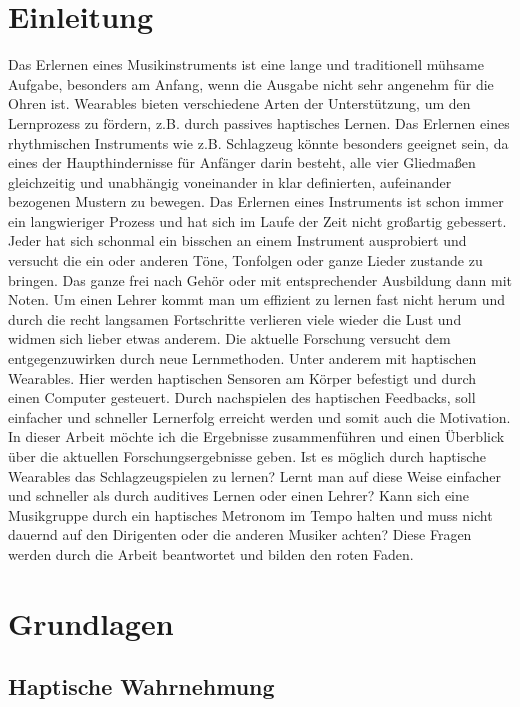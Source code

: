 \documentclass[ngerman,runningheads,a4paper]{llncs}
\begin{document}
\section{Einleitung}
Das Erlernen eines Musikinstruments ist eine lange und traditionell mühsame Aufgabe, besonders am Anfang, wenn die Ausgabe nicht sehr angenehm für die Ohren ist. Wearables bieten verschiedene Arten der Unterstützung, um den Lernprozess zu fördern, z.B. durch passives haptisches Lernen. Das Erlernen eines rhythmischen Instruments wie z.B. Schlagzeug könnte besonders geeignet sein, da eines der Haupthindernisse für Anfänger darin besteht, alle vier Gliedmaßen gleichzeitig und unabhängig voneinander in klar definierten, aufeinander bezogenen Mustern zu bewegen.
Das Erlernen eines Instruments ist schon immer ein langwieriger Prozess und hat sich im Laufe der Zeit nicht großartig gebessert.
Jeder hat sich schonmal ein bisschen an einem Instrument ausprobiert und versucht die ein oder anderen Töne, Tonfolgen oder ganze Lieder zustande zu bringen.
Das ganze frei nach Gehör oder mit entsprechender Ausbildung dann mit Noten.
Um einen Lehrer kommt man um effizient zu lernen fast nicht herum und durch die recht langsamen Fortschritte verlieren viele wieder die Lust und widmen sich lieber etwas anderem.
\newline
Die aktuelle Forschung versucht dem entgegenzuwirken durch neue Lernmethoden.
Unter anderem mit haptischen Wearables.
Hier werden haptischen Sensoren am Körper befestigt und durch einen Computer gesteuert.
Durch nachspielen des haptischen Feedbacks, soll einfacher und schneller Lernerfolg erreicht werden und somit auch die Motivation.
\newline
In dieser Arbeit möchte ich die Ergebnisse zusammenführen und einen Überblick über die aktuellen Forschungsergebnisse geben.
Ist es möglich durch haptische Wearables das Schlagzeugspielen zu lernen?
Lernt man auf diese Weise einfacher und schneller als durch auditives Lernen oder einen Lehrer?
Kann sich eine Musikgruppe durch ein haptisches Metronom im Tempo halten und muss nicht dauernd auf den Dirigenten oder die anderen Musiker achten?
Diese Fragen werden durch die Arbeit beantwortet und bilden den roten Faden.


\section{Grundlagen}

\subsection{Haptische Wahrnehmung}
\end{document}
